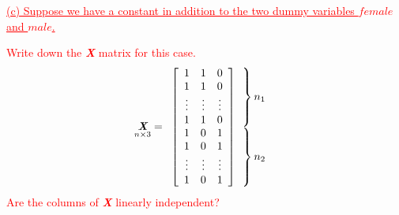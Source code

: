 \documentclass[12pt]{report}
\begin{document}
\newpage
\noindent \textcolor{red}
{
	\ul{(c) Suppose we have a constant in addition to the two dummy variables $female$ and $male$.}
}

\noindent \textcolor{red}
{
	Write down the \textit{\textbf{X}} matrix for this case.
}
\begin{equation*}
\underset{n\times3}{\textit{\textbf{X}}} = \begin{array}{c@{\!\!\!}l}
\left[ \begin{array}[c]{ccccc}
1 & 1 & 0 \\
1 & 1 & 0 \\
\vdots & \vdots & \vdots \\
1 & 1 & 0 \\
1 & 0 & 1 \\
1 & 0 & 1 \\
\vdots & \vdots & \vdots \\
1 & 0 & 1 \\
\end{array}  \right]
&
\begin{array}[c]{@{}l@{\,}l}
\left. \begin{array}{c} \vphantom{0} \\ \vphantom{0} \\\vphantom{\vdots}\\ \vphantom{0} \end{array} \right\} & \text{$n_1$} \\
\left. \begin{array}{c} \vphantom{1} \\ \vphantom{1} \\ \vphantom{\vdots}
\\ \vphantom{1}  \end{array} \right\} & \text{$n_2$} \\
\end{array}
\end{array}
\end{equation*}
\noindent \textcolor{red}
{
	Are the columns of \textit{\textbf{X}} linearly independent?
}
\end{document}
